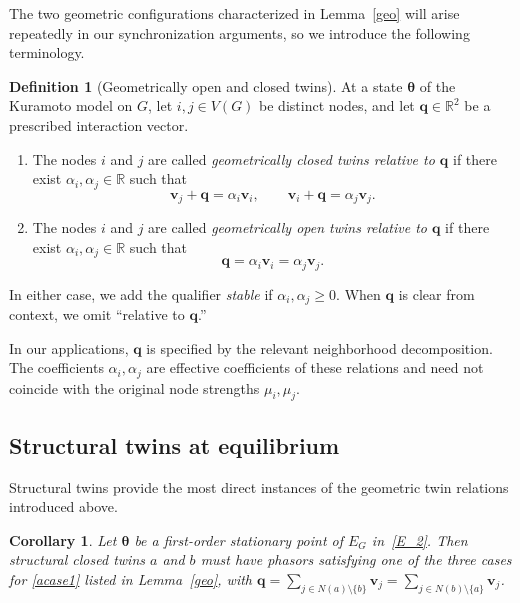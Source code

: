 \documentclass[11pt,reqno]{amsart}
\newtheorem{corollary}[theorem]{Corollary}
\theoremstyle{definition}
\newtheorem{definition}[theorem]{Definition}
\begin{document}
The two geometric configurations characterized in Lemma~\ref{geo} will arise repeatedly in our synchronization arguments, so we introduce the following terminology.
\begin{definition}[Geometrically open and closed twins]
At a state $\boldsymbol{\theta}$ of the Kuramoto model on
$G$, let $i,j\in V(G)$ be distinct nodes, and let
$\mathbf q\in\mathbb R^2$ be a prescribed interaction vector.

\begin{enumerate}
    \item The nodes $i$ and $j$ are called
    \emph{geometrically closed twins relative to $\mathbf q$}
    if there exist $\alpha_i,\alpha_j\in\mathbb R$ such that
    \[
        \mathbf v_j+\mathbf q=\alpha_i\mathbf v_i,
        \qquad
        \mathbf v_i+\mathbf q=\alpha_j\mathbf v_j.
    \]

    \item The nodes $i$ and $j$ are called
    \emph{geometrically open twins relative to $\mathbf q$}
    if there exist $\alpha_i,\alpha_j\in\mathbb R$ such that
    \[
        \mathbf q=\alpha_i\mathbf v_i=\alpha_j\mathbf v_j.
    \]
\end{enumerate}

In either case, we add the qualifier \emph{stable} if
$\alpha_i,\alpha_j\geq 0$.
When $\mathbf q$ is clear from context, we omit
``relative to $\mathbf q$.''
\end{definition}

In our applications, $\mathbf q$ is specified by the
relevant neighborhood decomposition.
The coefficients $\alpha_i,\alpha_j$ are effective
coefficients of these relations and need not coincide
with the original node strengths $\mu_i,\mu_j$.

\subsection{Structural twins at equilibrium}
Structural twins provide the most direct instances of the geometric twin relations introduced above.
\begin{corollary}\label{closed-twins}
Let $\boldsymbol{\theta}$ be a first-order stationary point of $E_G$ in~\eqref{E_2}. Then structural closed twins $a$ and $b$ must have phasors satisfying one of the three cases for \eqref{acase1} listed in Lemma~\ref{geo}, with $\boldsymbol q=\sum_{j \in N(a)\setminus\{b\}} \mathbf{v}_j = \sum_{j \in N(b)\setminus\{a\}} \mathbf{v}_j$.
\end{corollary}
\end{document}
